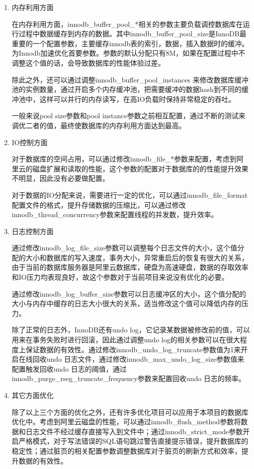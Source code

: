 \begin{enumerate}
\item 内存利用方面

在内存利用方面，innodb\_buffer\_pool\_*相关的参数主要负载调控数据库在运行过程中数据缓存到内存的数据。其中innodb\_buffer\_pool\_size是InnoDB最重要的一个配置参数，主要缓存innodb表的索引，数据，插入数据时的缓冲。为Innodb加速优化首要参数。参数的默认分配只有8M，如果在配置过程中不调整这个值的话，会导致数据库的性能体验过差。

除此之外，还可以通过调整innodb\_buffer\_pool\_instances 来修改数据库缓冲池的实例数量，通过开启多个内存缓冲池，把需要缓冲的数据hash到不同的缓冲池中，这样可以并行的内存读写，在高IO负载时保持非常稳定的吞吐。

一般来说pool size参数和pool instance参数之前相互配置，通过不断的测试来调优二者的值，最终使数据库的内存利用方面达到最高。
\item IO控制方面

对于数据库的空间占用，可以通过修改innodb\_file\_*参数来配置，考虑到阿里云的磁盘扩展和读取的性能，这个参数的配置对于数据库的的性能提升效果不明显，因此没有必要做配置。

对于数据的IO分配来说，需要进行一定的优化，可以通过innodb\_file\_format配置文件的格式，提升存储数据的压缩比，可以通过修改innodb\_thread\_concurrency参数来配置线程的并发数，提升效率。
\item 日志控制方面

通过修改innodb\_log\_file\_size参数可以调整每个日志文件的大小，这个值分配的大小和数据库的写入速度，事务大小，异常重启后的恢复有很大的关系，由于当前的数据库服务器是阿里云数据库，硬盘为高速硬盘，数据的存取效率和IO压力均表现良好，故这个参数对于当前项目来说没有优化的必要。

通过修改innodb\_log\_buffer\_size参数可以日志缓冲区的大小，这个值分配的大小与内存中缓存的日志大小很大的关系，适当修改这个值可以降低内存的压力。

除了正常的日志外，InnoDB还有undo log，它记录某数据被修改前的值，可以用来在事务失败时进行回滚，因此通过调整undo log的相关参数可以在很大程度上保证数据的有效性。通过修改innodb\_undo\_log\_truncate参数值为1来开启在线回收undo 日志文件，通过修改innodb\_max\_undo\_log\_size参数值来配置触发回收undo 日志的阈值，通过innodb\_purge\_rseg\_truncate\_frequency参数来配置回收undo 日志的频率。
\item 其它方面优化

除了以上三个方面的优化之外，还有许多优化项目可以应用于本项目的数据库优化中。考虑到阿里云磁盘的性能，可以通过innodb\_flush\_method参数将数据和日志文件不经过缓存直接写入到文件中；通过innodb\_strict\_mode参数开启严格模式，对于写法错误的SQL语句跳过警告直接提示错误，提升数据库的稳定性；通过脏页的相关配置参数调整数据库对于脏页的刷新方式和效率，提升数据的有效性。
\end{enumerate}

